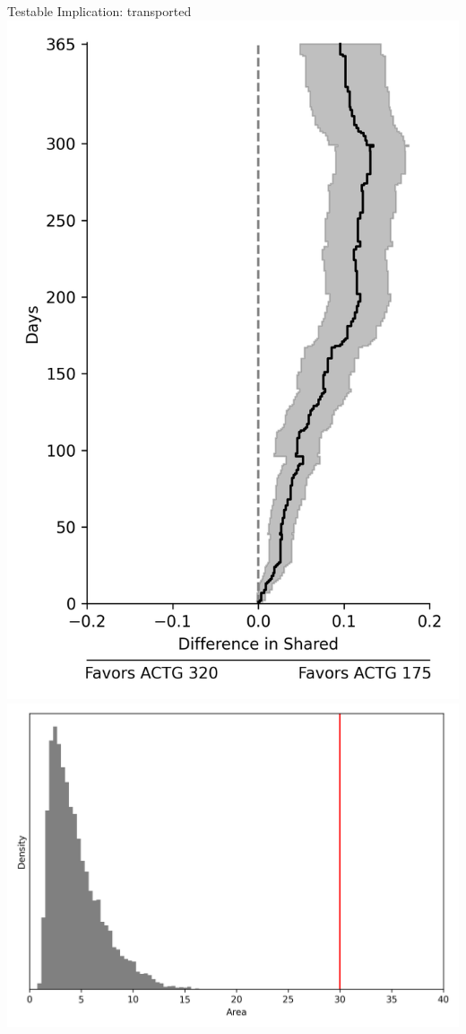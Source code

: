 \documentclass{beamer}
\begin{document}
\begin{frame}{Testable Implication: transported}
	\centering
	\includegraphics[scale=0.33]{images/diagnostic_graph_trn.png}	
	\includegraphics[scale=0.4]{images/diagnostic_test_trn.png}	
\end{frame}
\end{document}
